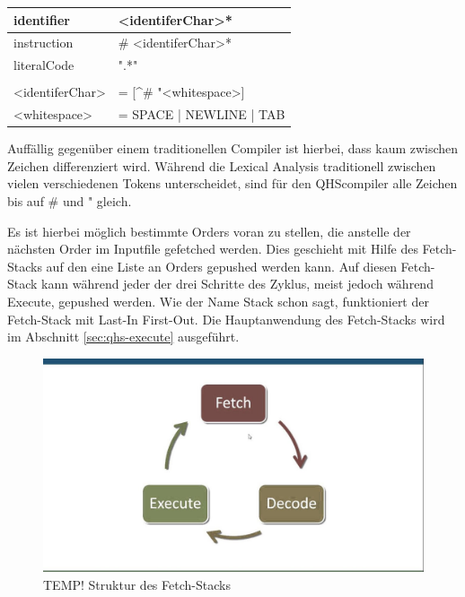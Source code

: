 \begin{table}[h]
    \centering
    \begin{tabular}{ll}
    \multicolumn{1}{l|}{identifier}        & \textless{}identiferChar\textgreater{}*                           \\ \hline
    \multicolumn{1}{l|}{instruction}       & \# \textless{}identiferChar\textgreater{}*                        \\ \hline
    \multicolumn{1}{l|}{literalCode}       & ".*"                                                              \\
                                           &                                                                   \\
    \textless{}identiferChar\textgreater{} & = {[}\textasciicircum{}\# "\textless{}whitespace\textgreater{}{]} \\
    \textless{}whitespace\textgreater{}    & = SPACE | NEWLINE | TAB
    
    \end{tabular}
\end{table}

Auffällig gegenüber einem traditionellen Compiler ist hierbei, dass kaum zwischen Zeichen differenziert wird. Während die Lexical Analysis traditionell zwischen vielen verschiedenen Tokens unterscheidet,
sind für den QHScompiler alle Zeichen bis auf \# und " gleich.

Es ist hierbei möglich bestimmte Orders voran zu stellen, die anstelle der nächsten Order im Inputfile gefetched werden. Dies geschieht mit Hilfe des Fetch-Stacks auf den eine Liste an Orders gepushed werden kann.
Auf diesen Fetch-Stack kann während jeder der drei Schritte des Zyklus, meist jedoch während Execute, gepushed werden. Wie der Name Stack schon sagt, funktioniert der Fetch-Stack mit Last-In First-Out.
Die Hauptanwendung des Fetch-Stacks wird im Abschnitt \ref{sec:qhs-execute} ausgeführt.

\begin{figure}[h!]
    \centering
    \includegraphics[scale=0.3]{resources/images/TEMP_von-neumann-cycle.jpg}
    \caption{TEMP! Struktur des Fetch-Stacks}
    \label{fig:fetch-stack}
\end{figure}

